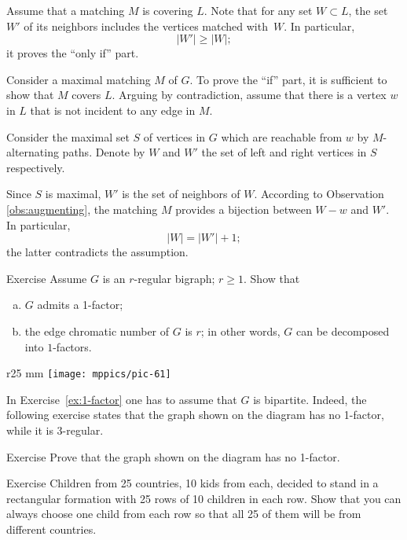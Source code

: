 Assume that a matching $M$ is covering $L$.
Note that for any set  $W\subset L$, the set $W'$ of its neighbors includes the vertices matched with~$W$.
In particular,
\[|W'|\ge |W|;\]
it proves the ``only if'' part.

Consider a maximal matching $M$ of $G$.
To prove the ``if'' part, it is sufficient to show that $M$ covers $L$.
Arguing by contradiction, assume that there is a vertex $w$ in $L$ that is not incident to any edge in $M$.

Consider the maximal set $S$ of vertices in $G$ which are reachable from $w$ by 
$M$-alternating paths.
Denote by $W$ and $W'$ the set of left and right vertices in $S$ respectively.

Since $S$ is maximal, $W'$ is the set of neighbors of $W$. 
According to Observation \ref{obs:augmenting}, the matching $M$ provides a bijection between $W-w$ and $W'$.
In particular, 
\[|W|=|W'|+1;\] 
the latter contradicts the assumption.
\qeds

\begin{thm}{Exercise}\label{ex:1-factor}
Assume $G$ is an $r$-regular bigraph; $r\ge 1$.
Show that 
\begin{enumerate}[(a)]
\item\label{ex:1-factor:a} $G$ admits a 1-factor;
\item\label{ex:1-factor:b} the edge chromatic number of $G$ is $r$; in other words, $G$ can be decomposed into $1$-factors.
\end{enumerate}

\end{thm}

{

\begin{wrapfigure}{r}{25 mm}
\vskip-6mm
\centering
\texttt{[image: mppics/pic-61]}
\vskip-0mm
\end{wrapfigure}

In Exercise~\ref{ex:1-factor} one has to assume that $G$ is bipartite.
Indeed, the following exercise states that the graph shown on the diagram has no 1-factor,
while it is 3-regular.

\begin{thm}{Exercise}\label{ex:no-1-factor}
Prove that the graph shown on the diagram has no 1-factor.
\end{thm}

}

\begin{thm}{Exercise}\label{ex:kids}
Children from 25 countries, 10 kids from each, decided to stand in a rectangular formation with 25 rows of 10 children in each row.
Show that you can always choose one child from each row so that all 25 of them will be from different countries.
\end{thm}


